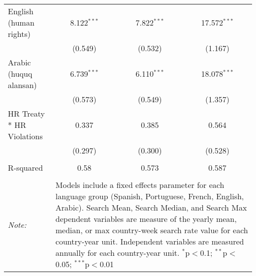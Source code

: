 \begin{table}[!htbp]
\begin{tabular}{@{\extracolsep{5pt}}lccc}
  English (human rights) & 8.122$^{***}$ & 7.822$^{***}$ & 17.572$^{***}$ \\ 
  & (0.549) & (0.532) & (1.167) \\ 
  Arabic (huquq alansan) & 6.739$^{***}$ & 6.110$^{***}$ & 18.078$^{***}$ \\ 
  & (0.573) & (0.549) & (1.357) \\ 
  HR Treaty * HR Violations & 0.337 & 0.385 & 0.564 \\ 
  & (0.297) & (0.300) & (0.528) \\ 
 \hline \\[-1.8ex] 
R-squared  & 0.58 & 0.573 & 0.587 \\ 
\hline 
\hline \\[-1.8ex] 
\textit{Note:}  & \multicolumn{3}{l}{\parbox[t]{8cm}{Models include a fixed effects parameter for each language group (Spanish, Portuguese, French, English, Arabic). Search Mean, Search Median, and Search Max dependent variables are measure of the yearly mean, median, or max country-week search rate value for each country-year unit. Independent variables are measured annually for each country-year unit. $^{*}$p$<$0.1; $^{**}$p$<$0.05; $^{***}$p$<$0.01}} \\ 
\end{tabular} 
\end{table} 
